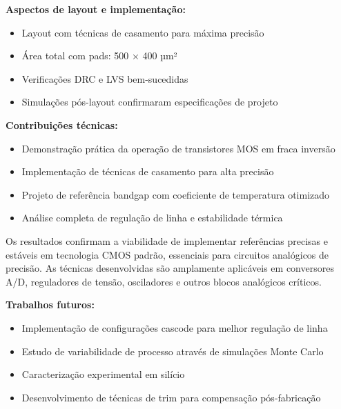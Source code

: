 ﻿\documentclass[12pt,a4paper]{article}
\begin{document}
\textbf{Aspectos de layout e implementação:}
\begin{itemize}
    \item Layout com técnicas de casamento para máxima precisão
    \item Área total com pads: 500 × 400 µm²
    \item Verificações DRC e LVS bem-sucedidas
    \item Simulações pós-layout confirmaram especificações de projeto
\end{itemize}

\textbf{Contribuições técnicas:}
\begin{itemize}
    \item Demonstração prática da operação de transistores MOS em fraca inversão
    \item Implementação de técnicas de casamento para alta precisão
    \item Projeto de referência bandgap com coeficiente de temperatura otimizado
    \item Análise completa de regulação de linha e estabilidade térmica
\end{itemize}

Os resultados confirmam a viabilidade de implementar referências precisas e estáveis em tecnologia CMOS padrão, essenciais para circuitos analógicos de precisão. As técnicas desenvolvidas são amplamente aplicáveis em conversores A/D, reguladores de tensão, osciladores e outros blocos analógicos críticos.

\textbf{Trabalhos futuros:}
\begin{itemize}
    \item Implementação de configurações cascode para melhor regulação de linha
    \item Estudo de variabilidade de processo através de simulações Monte Carlo
    \item Caracterização experimental em silício
    \item Desenvolvimento de técnicas de trim para compensação pós-fabricação
\end{itemize}
\end{document}
